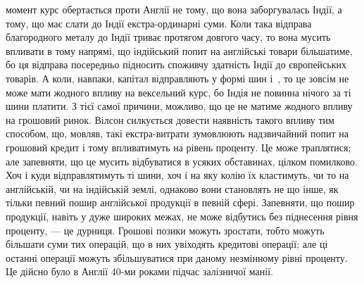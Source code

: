 момент курс обертається проти Англії не тому, що вона заборгувалась Індії, а
тому, що має слати до Індії екстра-ординарні суми. Коли така відправа благородного
металу до Індії триває протягом довгого часу, то вона мусить впливати
в тому напрямі, що індійський попит на англійські товари більшатиме, бо ця
відправа посередньо підносить споживчу здатність Індії до європейських товарів.
А коли, навпаки, капітал відправляють у формі шин і~, то це зовсім не
може мати жодного впливу на вексельний курс, бо Індія не повинна нічого за
ті шини платити. З тієї самої причини, можливо, що це не матиме жодного
впливу на грошовий ринок. Вілсон силкується довести наявність такого впливу
тим способом, що, мовляв, такі екстра-витрати зумовлюють надзвичайний попит
на грошовий кредит і тому впливатимуть на рівень проценту. Це може траплятися;
але запевняти, що це мусить відбуватися в усяких обставинах, цілком
помилково. Хоч і куди відправлятимуть ті шини, хоч і на яку колію їх кластимуть,
чи то на англійській, чи на індійській землі, однаково вони становлять
не що інше, як тільки певний пошир англійської продукції в певній сфері. Запевняти,
що пошир продукції, навіть у дуже широких межах, не може відбутись
без піднесення рівня проценту, — це дурниця. Грошові позики можуть зростати,
тобто можуть більшати суми тих операцій, що в них увіходять кредитові
операції; але ці останні операції можуть збільшуватися при даному незмінному
рівні проценту. Це дійсно було в Англії 40-ми роками підчас залізничої манії.
\parbreak{}  %
